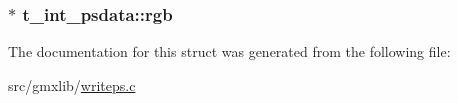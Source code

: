 \hypertarget{structt__int__psdata_a5b332b6cba5a0ba93dd29855b436d845}{
\subsubsection[{rgb}]{$\ast$ {\bf t\-\_\-int\-\_\-psdata\-::rgb}}}\label{structt__int__psdata_a5b332b6cba5a0ba93dd29855b436d845}


\-The documentation for this struct was generated from the following file\-:\begin{DoxyCompactItemize}
\item 
src/gmxlib/\hyperlink{writeps_8c}{writeps.\-c}\end{DoxyCompactItemize}
